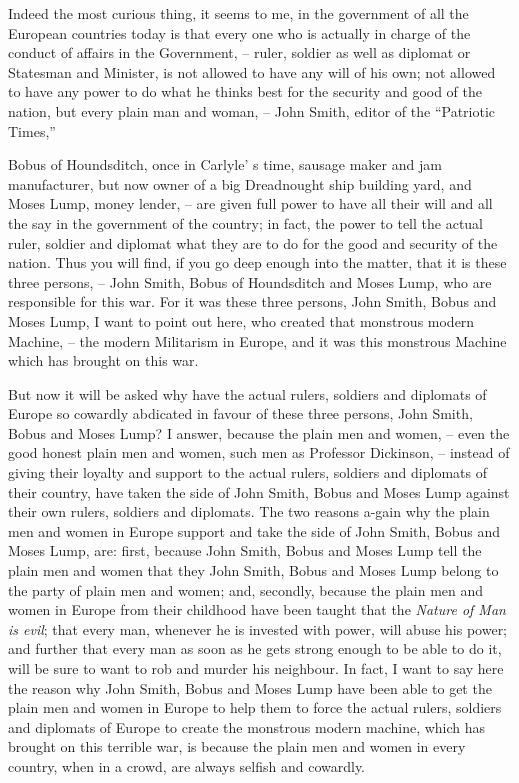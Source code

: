 Indeed the most curious thing, it seems to me, in the government of all the European countries today is that
every one who is actually in charge of the conduct of affairs in the Government,
-- ruler, soldier as well as diplomat or Statesman and Minister,
is not allowed to have any will of his own; not allowed to have any power to do what he thinks best for the security and good of the nation, but every plain man and woman,
-- John Smith, editor of the ``Patriotic Times,''

Bobus of Houndsditch, once in Carlyle' s time, sausage maker and jam manufacturer, but now owner of a big Dreadnought ship building yard, and Moses Lump, money lender,
-- are given full power to have all their will and all the say in the government of the country; in fact, the power to tell the actual ruler,
soldier and diplomat what they are to do for the good and security of the nation.
Thus you will find, if you go deep enough into the matter, that it is these three persons,
-- John Smith, Bobus of Houndsditch and Moses Lump,
who are responsible for this war.
For it was these three persons, John Smith, Bobus and Moses Lump,
I want to point out here, who created that monstrous modern Machine,
-- the modern Militarism in Europe,
and it was this monstrous Machine which has brought on this war.

But now it will be asked why have the actual rulers, soldiers and diplomats of Europe
so cowardly abdicated in favour of these three persons, John Smith, Bobus and Moses Lump?
I answer, because the plain men and women,
-- even the good honest plain men and women, such men as Professor Dickinson,
-- instead of giving their loyalty and support to the actual rulers,
soldiers and diplomats of their country, have taken the side of John Smith, Bobus and Moses Lump against their own rulers, soldiers and diplomats.
The two reasons a-gain why the plain men and women in Europe support and take the side of John Smith, Bobus and Moses Lump, are:
first, because John Smith, Bobus and Moses Lump tell the plain men and women that they John Smith, Bobus and Moses Lump belong to the party of plain men and women;
and, secondly, because the plain men and women in Europe from their childhood have been taught that the \emph{Nature of Man is evil};
that every man, whenever he is invested with power,
will abuse his power;
and further that every man as soon as he gets strong enough to be able to do it,
will be sure to want to rob and murder his neighbour.
In fact, I want to say here the reason
why John Smith, Bobus and Moses Lump
have been able to get the plain men and women in Europe to help them to force the actual rulers,
soldiers and diplomats of Europe to create the monstrous modern machine,
which has brought on this terrible war, is because the plain men and women in every country,
when in a crowd, are always selfish and cowardly.

